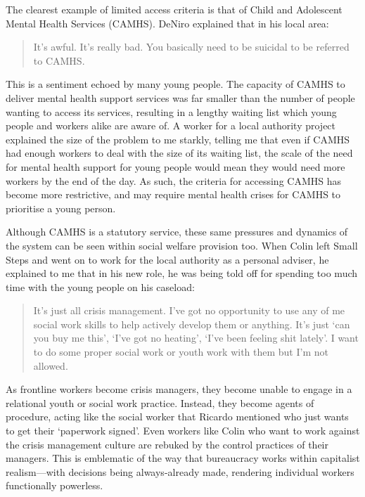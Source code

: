 The clearest example of limited access criteria is that of Child and Adolescent Mental Health Services (CAMHS). DeNiro explained that in his local area:
\begin{quote}
It's awful. It's really bad. You basically need to be suicidal to be referred to CAMHS.
\end{quote}
This is a sentiment echoed by many young people. The capacity of CAMHS to deliver mental health support services was far smaller than the number of people wanting to access its services, resulting in a lengthy waiting list which young people and workers alike are aware of. A worker for a local authority project explained the size of the problem to me starkly, telling me that even if CAMHS had enough workers to deal with the size of its waiting list, the scale of the need for mental health support for young people would mean they would need more workers by the end of the day. As such, the criteria for accessing CAMHS has become more restrictive, and may require mental health crises for CAMHS to prioritise a young person. 

Although CAMHS is a statutory service, these same pressures and dynamics of the system can be seen within social welfare provision too. When Colin left Small Steps and went on to work for the local authority as a personal adviser, he explained to me that in his new role, he was being told off for spending too much time with the young people on his caseload:
\begin{quote}
It's just all crisis management. I've got no opportunity to use any of me social work skills to help actively develop them or anything. It's just `can you buy me this', `I've got no heating', `I've been feeling shit lately'. I want to do some proper social work or youth work with them but I'm not allowed.
\end{quote}
As frontline workers become crisis managers, they become unable to engage in a relational youth or social work practice. Instead, they become agents of procedure, acting like the social worker that Ricardo mentioned who just wants to get their `paperwork signed'. Even workers like Colin who want to work against the crisis management culture are rebuked by the control practices of their managers. This is emblematic of the way that bureaucracy works within capitalist realism—with decisions being always-already made, rendering individual workers functionally powerless.

